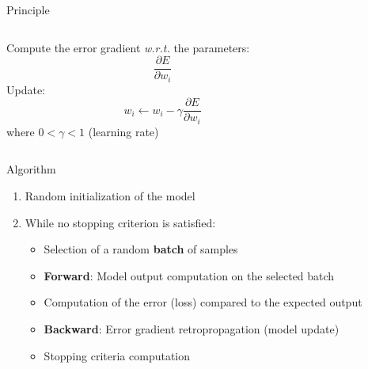 
\begin{frame}{Principle}
  \begin{columns}
    \begin{column}{0.5\textwidth}
      Compute the error gradient \emph{w.r.t.} the parameters:
      \[
      \frac{\partial{E}}{\partial{w_i}}
      \]
      Update:
      \[
      w_i \leftarrow w_i - \gamma\frac{\partial{E}}{\partial{w_i}}
      \]
      where $0 < \gamma < 1$ (learning rate)
    \end{column}
    \begin{column}{0.5\textwidth}
    \end{column}
  \end{columns}
\end{frame}

\begin{frame}{Algorithm}
  \begin{enumerate}[<+->]
    \item Random initialization of the model
    \item While no stopping criterion is satisfied:
      \begin{itemize}
        \item Selection of a random \textbf{batch} of samples
        \item \textbf{Forward}: Model output computation on the selected batch
        \item Computation of the error (loss) compared to the expected output
        \item \textbf{Backward}: Error gradient retropropagation (model update)
        \item Stopping criteria computation
      \end{itemize}
  \end{enumerate}
\end{frame}


